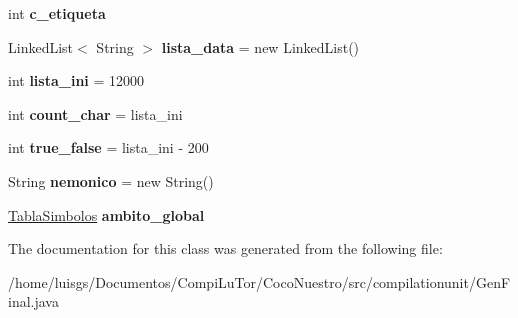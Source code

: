 \begin{DoxyCompactItemize}
\item 
\hypertarget{classcompilationunit_1_1_gen_final_a6fc8386c1c09844178d0f0b9d37feaa8}{
int {\bfseries c\_\-etiqueta}}
\label{classcompilationunit_1_1_gen_final_a6fc8386c1c09844178d0f0b9d37feaa8}

\item 
\hypertarget{classcompilationunit_1_1_gen_final_a83f2ba1b8f32032fe67b05c13f4e3b07}{
LinkedList$<$ String $>$ {\bfseries lista\_\-data} = new LinkedList()}
\label{classcompilationunit_1_1_gen_final_a83f2ba1b8f32032fe67b05c13f4e3b07}

\item 
\hypertarget{classcompilationunit_1_1_gen_final_a1ae8d29bc1a336c3d79937453b915cec}{
int {\bfseries lista\_\-ini} = 12000}
\label{classcompilationunit_1_1_gen_final_a1ae8d29bc1a336c3d79937453b915cec}

\item 
\hypertarget{classcompilationunit_1_1_gen_final_a96b32b9af47c829ebbbd70dd87f4015d}{
int {\bfseries count\_\-char} = lista\_\-ini}
\label{classcompilationunit_1_1_gen_final_a96b32b9af47c829ebbbd70dd87f4015d}

\item 
\hypertarget{classcompilationunit_1_1_gen_final_a976df1e73361f5967e9f6e53c31bf1cf}{
int {\bfseries true\_\-false} = lista\_\-ini -\/ 200}
\label{classcompilationunit_1_1_gen_final_a976df1e73361f5967e9f6e53c31bf1cf}

\item 
\hypertarget{classcompilationunit_1_1_gen_final_a06da980ac1a22771493c1c1b45eb9e0b}{
String {\bfseries nemonico} = new String()}
\label{classcompilationunit_1_1_gen_final_a06da980ac1a22771493c1c1b45eb9e0b}

\item 
\hypertarget{classcompilationunit_1_1_gen_final_a585e2ce44049a77faf3a2b62edaf5781}{
\hyperlink{classcompilationunit_1_1_tabla_simbolos}{TablaSimbolos} {\bfseries ambito\_\-global}}
\label{classcompilationunit_1_1_gen_final_a585e2ce44049a77faf3a2b62edaf5781}

\end{DoxyCompactItemize}


The documentation for this class was generated from the following file:\begin{DoxyCompactItemize}
\item 
/home/luisgs/Documentos/CompiLuTor/CocoNuestro/src/compilationunit/GenFinal.java\end{DoxyCompactItemize}

